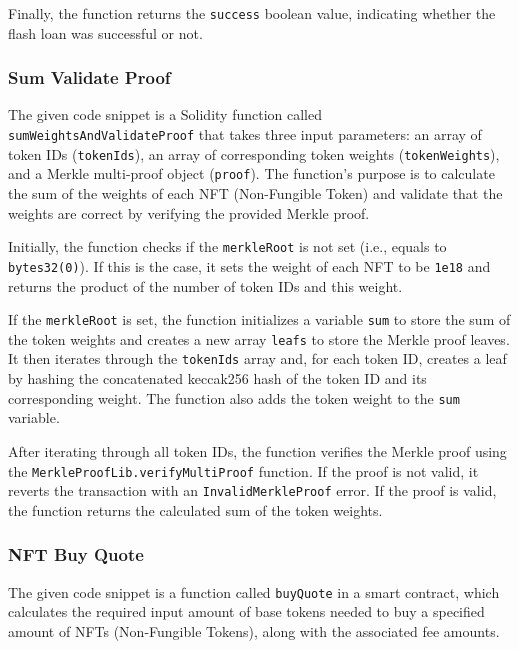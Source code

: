Finally, the function returns the \texttt{success} boolean value,
indicating whether the flash loan was successful or not.

\hypertarget{sum-validate-proof}{%
\subsubsection{Sum Validate Proof}\label{sum-validate-proof}}

The given code snippet is a Solidity function called
\texttt{sumWeightsAndValidateProof} that takes three input parameters:
an array of token IDs (\texttt{tokenIds}), an array of corresponding
token weights (\texttt{tokenWeights}), and a Merkle multi-proof object
(\texttt{proof}). The function's purpose is to calculate the sum of the
weights of each NFT (Non-Fungible Token) and validate that the weights
are correct by verifying the provided Merkle proof.

Initially, the function checks if the \texttt{merkleRoot} is not set
(i.e., equals to \texttt{bytes32(0)}). If this is the case, it sets the
weight of each NFT to be \texttt{1e18} and returns the product of the
number of token IDs and this weight.

If the \texttt{merkleRoot} is set, the function initializes a variable
\texttt{sum} to store the sum of the token weights and creates a new
array \texttt{leafs} to store the Merkle proof leaves. It then iterates
through the \texttt{tokenIds} array and, for each token ID, creates a
leaf by hashing the concatenated keccak256 hash of the token ID and its
corresponding weight. The function also adds the token weight to the
\texttt{sum} variable.

After iterating through all token IDs, the function verifies the Merkle
proof using the \texttt{MerkleProofLib.verifyMultiProof} function. If
the proof is not valid, it reverts the transaction with an
\texttt{InvalidMerkleProof} error. If the proof is valid, the function
returns the calculated sum of the token weights.

\hypertarget{nft-buy-quote}{%
\subsubsection{NFT Buy Quote}\label{nft-buy-quote}}

The given code snippet is a function called \texttt{buyQuote} in a smart
contract, which calculates the required input amount of base tokens
needed to buy a specified amount of NFTs (Non-Fungible Tokens), along
with the associated fee amounts.

